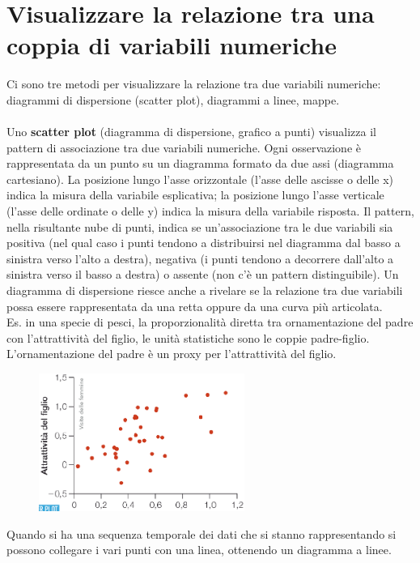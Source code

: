 \documentclass[10pt, draft]{book}
\begin{document}
\section{Visualizzare la relazione tra una coppia di variabili numeriche}
Ci sono tre metodi per visualizzare la relazione tra due variabili numeriche: diagrammi di dispersione (scatter plot), diagrammi a linee, mappe.
\\
\\
Uno \textbf{scatter plot} (diagramma di dispersione, grafico a punti) visualizza il pattern di associazione tra due variabili numeriche. Ogni osservazione è rappresentata da un punto su un diagramma formato da due assi (diagramma cartesiano). La posizione lungo l'asse orizzontale (l'asse delle ascisse o delle x) indica la misura della variabile esplicativa; la posizione lungo l'asse verticale (l'asse delle ordinate o delle y) indica la misura della variabile risposta. Il pattern, nella risultante nube di punti, indica se un'associazione tra le due variabili sia positiva (nel qual caso i punti tendono a distribuirsi nel diagramma dal basso a sinistra verso l'alto a destra), negativa (i punti tendono a decorrere dall'alto a sinistra verso il basso a destra) o assente (non c'è un pattern distinguibile). Un diagramma di dispersione riesce anche a rivelare se la relazione tra due variabili possa essere rappresentata da una retta oppure da una curva più articolata.
\\
Es. in una specie di pesci, la proporzionalità diretta tra ornamentazione del padre con l’attrattività del figlio, le unità statistiche sono le coppie padre-figlio. L’ornamentazione del padre è un proxy per l’attrattività del figlio.
    \begin{figure}[h]\label{fig2.5-1}
    \centering
    \includegraphics[width=0.6\textwidth]{fig2.5-1}
    \caption{\small{}}
    \end{figure}
Quando si ha una sequenza temporale dei dati che si stanno rappresentando si possono collegare i vari punti con una linea, ottenendo un diagramma a linee.
\end{document}
